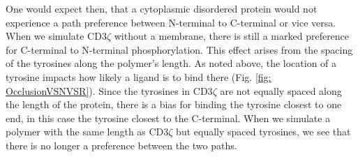 \documentclass[../../AdvancementSummary.tex]{subfiles}
\begin{document}
One would expect then, that a cytoplasmic disordered protein would not experience a path preference between N-terminal to C-terminal or vice versa. When we simulate CD3$\zeta$ without a membrane, there is still a marked preference for C-terminal to N-terminal phosphorylation. This effect arises from the spacing of the tyrosines along the polymer's length. As noted above, the location of a tyrosine impacts how likely a ligand is to bind there (Fig. \ref{fig: OcclusionVSNVSR}). Since the tyrosines in CD3$\zeta$ are not equally spaced along the length of the protein, there is a bias for binding the tyrosine closest to one end, in this case the tyrosine closest to the C-terminal. When we simulate a polymer with the same length as CD3$\zeta$ but equally spaced tyrosines, we see that there is no longer a preference between the two paths.
\end{document}
